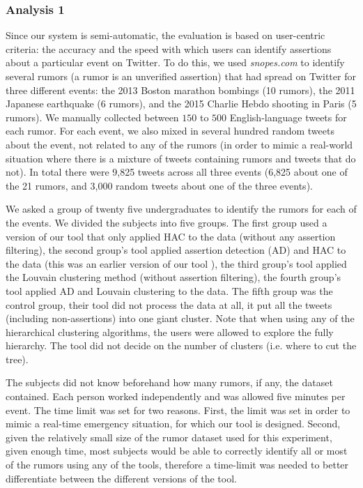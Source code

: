 \documentclass[letterpaper]{article}
\begin{document}
\subsubsection{Analysis 1}
Since our system is semi-automatic, the evaluation is based on user-centric criteria: the accuracy and the speed with which users can identify assertions about a particular event on Twitter. To do this, we used \emph{snopes.com} to identify several rumors (a rumor is an unverified assertion) that had spread on Twitter for three different events: the 2013 Boston marathon bombings (10 rumors), the 2011 Japanese earthquake (6 rumors), and the 2015 Charlie Hebdo shooting in Paris (5 rumors). We manually collected between $150$ to $500$ English-language tweets for each rumor. For each event, we also mixed in several hundred random tweets about the event, not related to any of the rumors (in order to mimic a real-world situation where there is a mixture of tweets containing rumors and tweets that do not). In total there were 9,825 tweets across all three events (6,825 about one of the 21 rumors, and 3,000 random tweets about one of the three events).  

We asked a group of twenty five undergraduates to identify the rumors for each of the events. We divided the subjects into five groups. The first group used a version of our tool that only applied HAC to the data (without any assertion filtering), the second group's tool applied assertion detection (AD) and HAC to the data (this was an earlier version of our tool \cite{vosoughi_rd_2015}), the third group's tool applied the Louvain clustering method (without assertion filtering), the fourth group's tool applied AD and Louvain clustering to the data. The fifth group was the control group, their tool did not process the data at all, it put all the tweets (including non-assertions) into one giant cluster. Note that when using any of the hierarchical clustering algorithms, the users were allowed to explore the fully hierarchy. The tool did not decide on the number of clusters (i.e. where to cut the tree).

The subjects did not know beforehand how many rumors, if any, the dataset contained. Each person worked independently and was allowed five minutes per event. The time limit was set for two reasons. First, the limit was set in order to mimic a real-time emergency situation, for which our tool is designed. Second, given the relatively small size of the rumor dataset used for this experiment, given enough time, most subjects would be able to correctly identify all or most of the rumors using any of the tools, therefore a time-limit was needed to better differentiate between the different versions of the tool.
\end{document}
